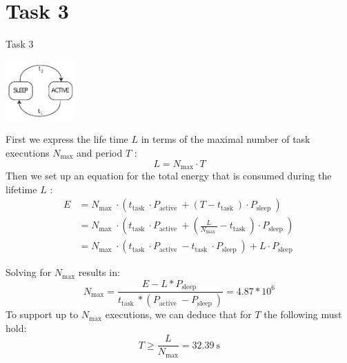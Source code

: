 
\section{Task 3}

\setcounter{task}{1}

\begin{frame}[allowframebreaks]{Task 3}{}
  \begin{tasknoinc}
    \centering
    \includegraphics[width=0.2\textwidth]{./figures/task3.png}
  \end{tasknoinc}
  \begin{solutionnoinc}
    First we express the life time $L$ in terms of the maximal number of task executions $N_{\max }$ and period $T$ :
    \[
    L=N_{\max } \cdot T
    \]
    Then we set up an equation for the total energy that is consumed during the lifetime $L$ :
    \[
    \begin{aligned}
    E & =N_{\text {max }} \cdot\left(t_{\text {task }} \cdot P_{\text {active }}+\left(T-t_{\text {task }}\right) \cdot P_{\text {sleep }}\right) \\
    & =N_{\text {max }} \cdot\left(t_{\text {task }} \cdot P_{\text {active }}+\left(\frac{L}{N_{\text {max }}}-t_{\text {task }}\right) \cdot P_{\text {sleep }}\right) \\
    & =N_{\text {max }} \cdot\left(t_{\text {task }} \cdot P_{\text {active }}-t_{\text {task }} \cdot P_{\text {sleep }}\right)+L \cdot P_{\text {sleep }}
    \end{aligned}
    \]
    \end{solutionnoinc}
    \begin{solution}
    Solving for $N_{\max }$ results in:
    \[
    N_{\max }=\frac{E-L * P_{\text {sleep }}}{t_{\text {task }} *\left(P_{\text {active }}-P_{\text {sleep }}\right)}=4.87 * 10^6
    \]
    To support up to $N_{\max }$ executions, we can deduce that for $T$ the following must hold:
    \[
    T \geq \frac{L}{N_{\max }}=32.39 \mathrm{~s}
    \]
  \end{solution}
\end{frame}

